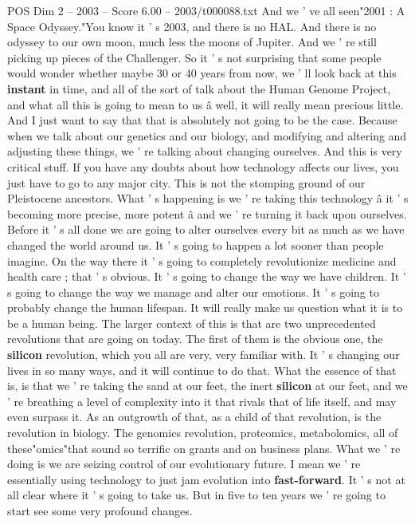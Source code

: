 \begin{textsample}{POS Dim 2 – 2003 – Score 6.00 – 2003/t000088.txt}
And we ' ve all seen"2001 : A Space Odyssey."You know it ' s 2003, and there is no HAL.
And there is no odyssey to our own moon, much less the moons of Jupiter.
And we ' re still picking up pieces of the Challenger.
So it ' s not surprising that some people would wonder whether maybe 30 or 40 years from now, we ' ll look back at this \textbf{instant} in time, and all of the sort of talk about the Human Genome Project, and what all this is going to mean to us â well, it will really mean precious little.
And I just want to say that that is absolutely not going to be the case.
Because when we talk about our genetics and our biology, and modifying and altering and adjusting these things, we ' re talking about changing ourselves.
And this is very critical stuff.
If you have any doubts about how technology affects our lives, you just have to go to any major city.
This is not the stomping ground of our Pleistocene ancestors.
What ' s happening is we ' re taking this technology â it ' s becoming more precise, more potent â and we ' re turning it back upon ourselves.
Before it ' s all done we are going to alter ourselves every bit as much as we have changed the world around us.
It ' s going to happen a lot sooner than people imagine.
On the way there it ' s going to completely revolutionize medicine and health care ; that ' s obvious.
It ' s going to change the way we have children.
It ' s going to change the way we manage and alter our emotions.
It ' s going to probably change the human lifespan.
It will really make us question what it is to be a human being.
The larger context of this is that are two unprecedented revolutions that are going on today.
The first of them is the obvious one, the \textbf{silicon} revolution, which you all are very, very familiar with.
It ' s changing our lives in so many ways, and it will continue to do that.
What the essence of that is, is that we ' re taking the sand at our feet, the inert \textbf{silicon} at our feet, and we ' re breathing a level of complexity into it that rivals that of life itself, and may even surpass it.
As an outgrowth of that, as a child of that revolution, is the revolution in biology.
The genomics revolution, proteomics, metabolomics, all of these"omics"that sound so terrific on grants and on business plans.
What we ' re doing is we are seizing control of our evolutionary future.
I mean we ' re essentially using technology to just jam evolution into \textbf{fast-forward}.
It ' s not at all clear where it ' s going to take us.
But in five to ten years we ' re going to start see some very profound changes.

\end{textsample}
